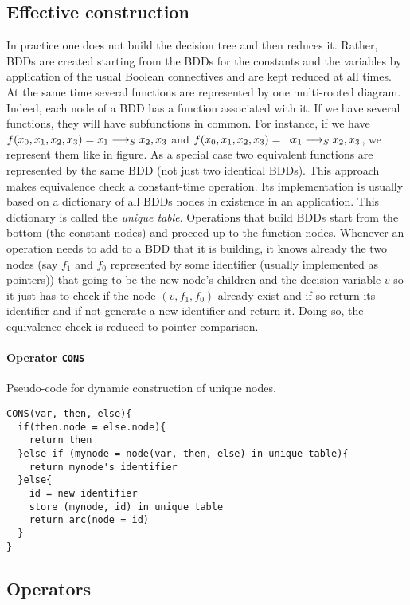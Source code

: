 \documentclass[a4paper,10pt]{article}
\begin{document}
\subsection{Effective construction}
In practice one does not build the decision tree and then reduces it.
Rather, BDDs are created starting from the BDDs for the constants and the variables by application of the usual Boolean connectives and are kept reduced at all times.
At the same time several functions are represented by one multi-rooted diagram.
Indeed, each node of a BDD has a function associated with it.
If we have several functions, they will have subfunctions in common.
For instance, if we have $f(x_0, x_1, x_2, x_3) = x_1 \longrightarrow_S x_2, x_3$ and $f(x_0, x_1, x_2, x_3) = \lnot x_1 \longrightarrow_S x_2, x_3$, we represent them like in figure. As a special case two equivalent functions are represented by the same BDD (not just two identical BDDs).
This approach makes equivalence check a constant-time operation.
Its implementation is usually based on a dictionary of all BDDs nodes in existence in an application.
This dictionary is called the \textit{unique table}.
Operations that build BDDs start from the bottom (the constant nodes) and proceed up to the function nodes.
Whenever an operation needs to add to a BDD that it is building, it knows already the two nodes (say $f_1$ and $f_0$ represented by some identifier (usually implemented as pointers)) that going to be the new node's children and the decision variable $v$ so it just has to check if the node $(v, f_1, f_0)$ already exist and if so return its identifier and if not generate a new identifier and return it.
Doing so, the equivalence check is reduced to pointer comparison.

\paragraph{Operator \texttt{CONS}\\}


Pseudo-code for dynamic construction of unique nodes.

\begin{lstlisting}
CONS(var, then, else){
  if(then.node = else.node){
    return then
  }else if (mynode = node(var, then, else) in unique table){
    return mynode's identifier
  }else{
    id = new identifier
    store (mynode, id) in unique table
    return arc(node = id)
  }
}
\end{lstlisting}


\subsection{Operators}
\end{document}
